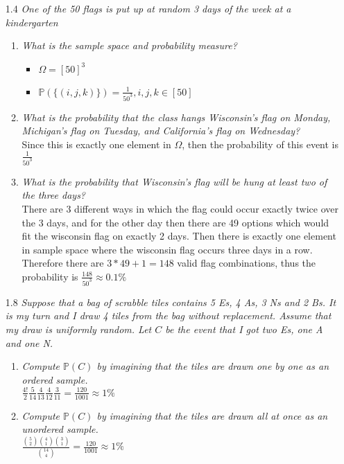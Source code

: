 \documentclass[12pt, letterpaper]{article}
\newcommand{\Pro}{\mathbb{P}}
\begin{document}
\begin{enumerate}
	\item[1.4] \textit{One of the 50 flags is put up at random 3 days of the week at a kindergarten}
	\begin{enumerate}
		\item \textit{What is the sample space and probability measure?}
		\begin{itemize}
			\item $\Omega = [50]^3$
			\item $\Pro(\{(i,j,k)\}) = \frac{1}{50^3}, i,j,k \in [50]$
		\end{itemize}
		\item \textit{What is the probability that the class hangs Wisconsin’s flag on Monday,
Michigan’s flag on Tuesday, and California’s flag on Wednesday?}\\
		Since this is exactly one element in $\Omega$, then the probability of this event is $\frac{1}{50^3}$
		\item \textit{What is the probability that Wisconsin’s flag will be hung at least two of
the three days?}\\
	There are 3 different ways in which the flag could occur exactly twice over the 3 days, and for the other day then there are 49 options which would fit the wisconsin flag on exactly 2 days.  Then there is exactly one element in sample space where the wisconsin flag occurs three days in a row.  Therefore there are 
	$3*49 + 1 = 148$ valid flag combinations, thus the probability is 
	$\frac{148}{50^3} \approx 0.1\%$
	\end{enumerate}
	\item[1.8] \textit{Suppose that a bag of scrabble tiles contains 5 Es, 4 As, 3 Ns and
2 Bs. It is my turn and I draw 4 tiles from the bag without replacement. Assume
that my draw is uniformly random. Let $C$ be the event that I got two Es, one A
and one N.}
	\begin{enumerate}
		\item \textit{Compute $\Pro(C )$ by imagining that the tiles are drawn one by one as an
ordered sample.}\\
	$\displaystyle \frac{4!}{2} \frac{5}{14}\frac{4}{13}\frac{4}{12}\frac{3}{11} = \frac{120}{1001} \approx 1\% $
		\item \textit{Compute $\Pro(C )$ by imagining that the tiles are drawn all at once as an
unordered sample.}\\
		$\displaystyle \frac{\binom{5}{2}\binom{4}{1}\binom{3}{1}}{\binom{14}{4}} = \frac{120}{1001}\approx 1\%$
	\end{enumerate}

\end{enumerate}
\end{document}

